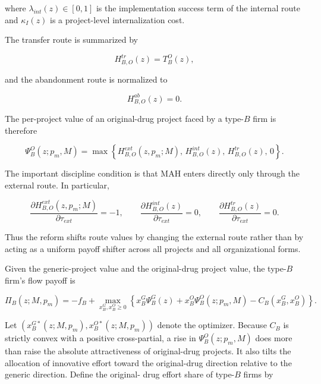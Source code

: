 \documentclass[12pt]{article}
\begin{document}
where $\lambda_{int}(z)\in[0,1]$ is the implementation success term of the internal route and
$\kappa_I(z)$ is a project-level internalization cost.

The transfer route is summarized by

\begin{equation}
H_{B,O}^{tr}(z)=T_B^O(z),
\end{equation}

and the abandonment route is normalized to

\begin{equation}
H_{B,O}^{ab}(z)=0.
\end{equation}

The per-project value of an original-drug project faced by a type-$B$ firm is therefore

\begin{equation}
\Psi_B^O(z;p_m,M)=\max\left\{H_{B,O}^{ext}(z,p_m;M),\,H_{B,O}^{int}(z),\,H_{B,O}^{tr}(z),\,0\right\}.
\end{equation}

The important discipline condition is that MAH enters directly only through the external route.
In particular,

\begin{equation}
\frac{\partial H_{B,O}^{ext}(z,p_m;M)}{\partial \tau_{ext}}=-1,\qquad
\frac{\partial H_{B,O}^{int}(z)}{\partial \tau_{ext}}=0,\qquad
\frac{\partial H_{B,O}^{tr}(z)}{\partial \tau_{ext}}=0.
\end{equation}

Thus the reform shifts route values by changing the external route rather than by acting as
a uniform payoff shifter across all projects and all organizational forms.

Given the generic-project value and the original-drug project value, the type-$B$ firm's flow
payoff is

\begin{equation}
\Pi_B(z;M,p_m)=-f_B+\max_{x_B^G,x_B^O\ge 0}\left\{x_B^G\Psi_B^G(z)+x_B^O\Psi_B^O(z;p_m,M)-C_B(x_B^G,x_B^O)\right\}.
\end{equation}

Let $(x_B^{G*}(z;M,p_m),x_B^{O*}(z;M,p_m))$ denote the optimizer. Because $C_B$ is strictly
convex with a positive cross-partial, a rise in $\Psi_B^O(z;p_m,M)$ does more than raise the
absolute attractiveness of original-drug projects. It also tilts the allocation of innovative
effort toward the original-drug direction relative to the generic direction. Define the original-
drug effort share of type-$B$ firms by
\end{document}
